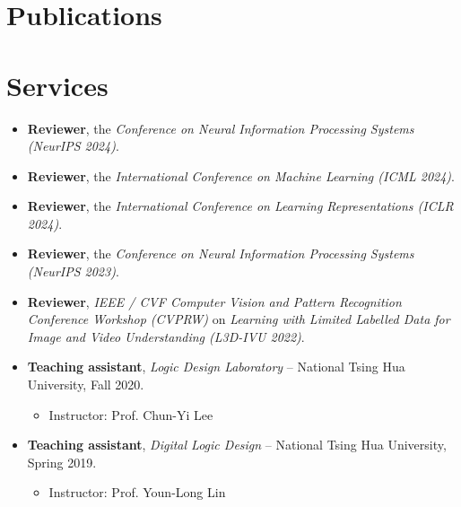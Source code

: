 \documentclass{cvclass}
\begin{document}
\section{Publications}
\makepublications


\section{Services}
\begin{itemize}
\setlength\itemsep{0.5em}
    \item \textbf{Reviewer}, the \textit{Conference on Neural Information Processing Systems (NeurIPS 2024)}.
    \item \textbf{Reviewer}, the \textit{International Conference on Machine Learning (ICML 2024)}.
    \item \textbf{Reviewer}, the \textit{International Conference on Learning Representations (ICLR 2024)}.
    \item \textbf{Reviewer}, the \textit{Conference on Neural Information Processing Systems (NeurIPS 2023)}.
    \item \textbf{Reviewer}, \textit{IEEE / CVF Computer Vision and Pattern Recognition Conference Workshop (CVPRW)} on \textit{Learning with Limited Labelled Data for Image and Video Understanding (L3D-IVU 2022)}.
    \item \textbf{Teaching assistant}, \textit{Logic Design Laboratory} -- National Tsing Hua University, Fall 2020.
        \begin{itemize}
        \item Instructor: Prof. Chun-Yi Lee
        \end{itemize}
    \item \textbf{Teaching assistant}, \textit{Digital Logic Design} -- National Tsing Hua University, Spring 2019.
        \begin{itemize}
        \item Instructor: Prof. Youn-Long Lin
        \end{itemize}
\end{itemize}

\vspace{-0.5em}
\end{document}
